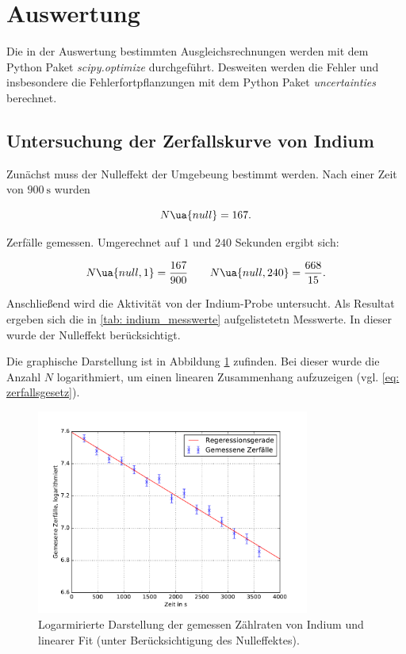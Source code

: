\section{Auswertung}

Die in der Auswertung bestimmten Ausgleichsrechnungen werden mit
dem Python Paket \emph{scipy.optimize}\cite{scipy} durchgeführt.
Desweiten werden die Fehler und insbesondere die Fehlerfortpflanzungen
mit dem Python Paket \emph{uncertainties}\cite{uncertainties} berechnet.

\subsection{Untersuchung der Zerfallskurve von Indium}
Zunächst muss der Nulleffekt der Umgebeung bestimmt werden.
Nach einer Zeit von $\SI{900}{\second}$ wurden

\begin{equation*}
  N\ua{null}=167.
\end{equation*}

Zerfälle gemessen. Umgerechnet auf $1$ und $240$ Sekunden ergibt sich:

\begin{equation}
  \label{eq:nulleffekt_indium}
  N\ua{null,1}=\frac{167}{900} \qquad N\ua{null,240}=\frac{668}{15}.
\end{equation}

Anschließend wird die Aktivität von der Indium-Probe untersucht.
Als Resultat ergeben sich die in \ref{tab: indium_messwerte} aufgelistetetn Messwerte.
In dieser wurde der Nulleffekt berücksichtigt.


Die graphische Darstellung ist in Abbildung \ref{fig: plot_indium} zufinden. Bei dieser wurde
die Anzahl $N$ logarithmiert, um einen linearen Zusammenhang aufzuzeigen (vgl. \eqref{eq: zerfallsgesetz}).
\begin{figure}
  \centering
  \includegraphics[width=0.8\textwidth]{pics/logarithmiert_indium.pdf}
  \caption{Logarmirierte Darstellung der gemessen Zählraten von Indium und linearer Fit  (unter Berücksichtigung des Nulleffektes).}
  \label{fig: plot_indium}
\end{figure}

